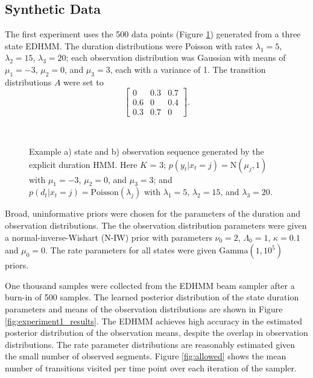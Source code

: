\subsection{Synthetic Data}

The first experiment uses the 500 data points (Figure \ref{fig:experiment1_data}) generated from a three state EDHMM. The duration distributions were Poisson with rates $\lambda_1 = 5$, $\lambda_2 = 15$, $\lambda_3 = 20$; each observation distribution was Gaussian with means of $\mu_1 = -3$, $\mu_2 = 0$, and $\mu_3 = 3$, each with a variance of 1. The transition distributions $A$ were set to
\begin{equation*}
\begin{bmatrix}
    0 & 0.3 & 0.7 \\ 0.6 & 0 & 0.4 \\ 0.3 & 0.7 & 0
\end{bmatrix}.  
\end{equation*}

\begin{figure}
     \\
    \caption{Example a) state and b) observation sequence generated by the explicit duration HMM. Here $K$ = 3; $p(y_t|x_t=j) = \mathrm{N}(\mu_j, 1)$ with $\mu_1 = -3$, $\mu_2 = 0$, and $\mu_3 = 3$; and $p(d_t|x_t=j) = \mathrm{Poisson}(\lambda_j)$ with $\lambda_1 = 5$, $\lambda_2 = 15$, and $\lambda_3 = 20$.}
    \label{fig:experiment1_data}
\end{figure}

Broad, uninformative priors were chosen for the parameters of the duration and observation distributions. The the observation distribution parameters were given a normal-inverse-Wishart (N-IW) prior with parameters $\nu_0 = 2$, $\Lambda_0 = 1$, $\kappa=0.1$ and $\mu_0 = 0$. The rate parameters for all states were given $\mathrm{Gamma}(1, 10^{5})$ priors. 

One thousand samples were collected from the EDHMM beam sampler after a burn-in of 500 samples. The learned posterior distribution of the state duration parameters and means of the observation distributions are shown in Figure \ref{fig:experiment1_results}.  The EDHMM achieves high accuracy in the estimated posterior distribution of the observation means, despite the overlap in observation distributions. The rate parameter distributions are reasonably estimated given the small number of observed segments. Figure \ref{fig:allowed} shows the mean number of transitions visited per time point over each iteration of the sampler. 

